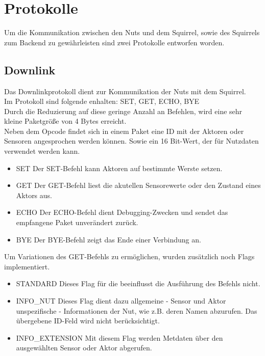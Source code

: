 \documentclass[12pt,a4paper]{article}
\begin{document}
\section{Protokolle}
Um die Kommunikation zwischen den Nuts und dem Squirrel, sowie des Squirrels zum Backend zu gewährleisten sind zwei Protokolle entworfen worden.
	\subsection{Downlink}  
Das Downlinkprotokoll dient zur Kommunikation der Nuts mit dem Squirrel.\\
Im Protokoll sind folgende enhalten: SET, GET, ECHO, BYE\\
Durch die Reduzierung auf diese geringe Anzahl an Befehlen, wird eine sehr kleine Paketgröße von 4 Bytes erreicht.\\
Neben dem Opcode findet sich in einem Paket eine ID mit der Aktoren oder Sensoren angesprochen werden können. Sowie ein 16 Bit-Wert, der für Nutzdaten verwendet werden kann.\\
\begin{itemize}
	\item{SET}
Der SET-Befehl kann Aktoren auf bestimmte Werste setzen.
	\item{GET}
Der GET-Befehl liest die akutellen Sensorewerte oder den Zustand eines Aktors aus.
	\item{ECHO}
Der ECHO-Befehl dient Debugging-Zwecken und sendet das empfangene Paket unverändert zurück.
	\item{BYE}
Der BYE-Befehl zeigt das Ende einer Verbindung an.
\end{itemize}

Um Variationen des GET-Befehls zu ermöglichen, wurden zusätzlich noch Flags implementiert.\\
\begin{itemize}
	\item{STANDARD}
Dieses Flag für die beeinflusst die Ausführung des Befehls nicht.
	\item{INFO_NUT}
Dieses Flag dient dazu allgemeine - Sensor und Aktor unspezifische - Informationen der Nut, wie z.B. deren Namen abzurufen. Das übergebene ID-Feld wird nicht berücksichtigt.\\
	\item{INFO_EXTENSION}
Mit diesem Flag werden Metdaten über den ausgewählten Sensor oder Aktor abgerufen.
\end{itemize}
\end{document}
